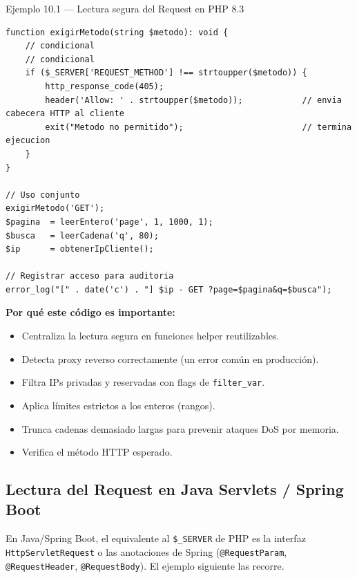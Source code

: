 \documentclass[11pt,a4paper,openany]{book}
\begin{document}
\begin{cajaejemplo}{Ejemplo 10.1 --- Lectura segura del Request en PHP 8.3}
\begin{lstlisting}[style=php,caption={request-helpers.php},label=lst:10.4]
function exigirMetodo(string $metodo): void {
    // condicional
    // condicional
    if ($_SERVER['REQUEST_METHOD'] !== strtoupper($metodo)) {
        http_response_code(405);
        header('Allow: ' . strtoupper($metodo));            // envia cabecera HTTP al cliente
        exit("Metodo no permitido");                        // termina ejecucion
    }
}

// Uso conjunto
exigirMetodo('GET');
$pagina  = leerEntero('page', 1, 1000, 1);
$busca   = leerCadena('q', 80);
$ip      = obtenerIpCliente();

// Registrar acceso para auditoria
error_log("[" . date('c') . "] $ip - GET ?page=$pagina&q=$busca");
\end{lstlisting}

\textbf{Por qué este código es importante:}
\begin{itemize}
\item Centraliza la lectura segura en funciones helper reutilizables.
\item Detecta proxy reverso correctamente (un error común en
producción).
\item Filtra IPs privadas y reservadas con flags de
\texttt{filter\_var}.
\item Aplica límites estrictos a los enteros (rangos).
\item Trunca cadenas demasiado largas para prevenir ataques DoS por
memoria.
\item Verifica el método HTTP esperado.
\end{itemize}
\end{cajaejemplo}

\subsection{Lectura del Request en Java Servlets / Spring Boot}

En Java/Spring Boot, el equivalente al \texttt{\$\_SERVER}
de PHP es la interfaz \texttt{HttpServletRequest} o las anotaciones
de Spring (\texttt{@RequestParam}, \texttt{@RequestHeader},
\texttt{@RequestBody}). El ejemplo siguiente las recorre.
\end{document}
